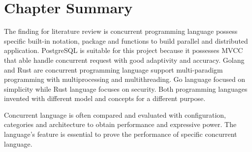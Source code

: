 \section{Chapter Summary}

The finding for literature review is concurrent programming language possess specific built-in notation, package and functions to build parallel and distributed application. PostgreSQL is suitable for this project because it possesses MVCC that able handle concurrent request with good adaptivity and accuracy. Golang and Rust are concurrent programming language support multi-paradigm programming with multiprocessing and multithreading. Go language focused on simplicity while Rust language focuses on security. Both programming languages invented with different model and concepts for a different purpose.

Concurrent language is often compared and evaluated with configuration, categories and architecture to obtain performance and expressive power. The language's feature is essential to prove the performance of specific concurrent language. 

